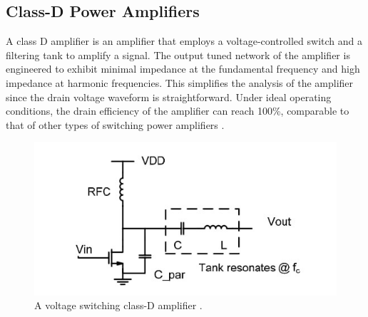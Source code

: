 \subsection{Class-D Power Amplifiers}
A class D amplifier is an amplifier that employs a voltage-controlled switch and a filtering tank to amplify a signal. The output tuned network of the amplifier is engineered to exhibit minimal impedance at the fundamental frequency and high impedance at harmonic frequencies. This simplifies the analysis of the amplifier since the drain voltage waveform is straightforward. Under ideal operating conditions, the drain efficiency of the amplifier can reach 100\%, comparable to that of other types of switching power amplifiers \cite{twelveth}.

\begin{figure}[h]
    \centering
    \includegraphics{figures/class-D.jpeg}
    \caption{A voltage switching class-D amplifier \cite{twelveth}.}
    \label{fig:class-D-amplifier}
\end{figure}

